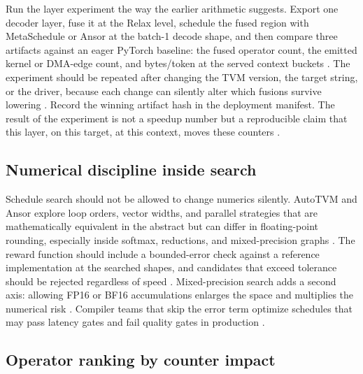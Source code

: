 Run the layer experiment the way the earlier arithmetic suggests. Export one decoder layer, fuse it at the Relax level, schedule the fused region with MetaSchedule or Ansor at the batch-1 decode shape, and then compare three artifacts against an eager PyTorch baseline: the fused operator count, the emitted kernel or DMA-edge count, and bytes/token at the served context buckets \citep{chen2018tvm,zheng2020ansor,patel2025llminference}. The experiment should be repeated after changing the TVM version, the target string, or the driver, because each change can silently alter which fusions survive lowering \citep{memoryfloor2026,chen2020compilerbasedhardw}. Record the winning artifact hash in the deployment manifest. The result of the experiment is not a speedup number but a reproducible claim that this layer, on this target, at this context, moves these counters \citep{taxbreak2026,memoryfloor2026}.

\subsection{Numerical discipline inside search}

Schedule search should not be allowed to change numerics silently. AutoTVM and Ansor explore loop orders, vector widths, and parallel strategies that are mathematically equivalent in the abstract but can differ in floating-point rounding, especially inside softmax, reductions, and mixed-precision graphs \citep{zheng2020ansor,chen2018autotvm,dao2022flashattention}. The reward function should include a bounded-error check against a reference implementation at the searched shapes, and candidates that exceed tolerance should be rejected regardless of speed \citep{dao2022flashattention,patel2025llminference}. Mixed-precision search adds a second axis: allowing FP16 or BF16 accumulations enlarges the space and multiplies the numerical risk \citep{lai2023relax,memoryfloor2026}. Compiler teams that skip the error term optimize schedules that may pass latency gates and fail quality gates in production \citep{chen2020compilerbasedhardw,taxbreak2026}.

\subsection{Operator ranking by counter impact}


